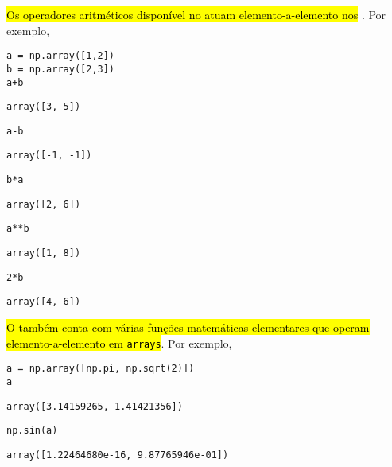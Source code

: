 \hl{Os operadores aritméticos disponível no {\python} atuam elemento-a-elemento nos {\PYTHONnumpyDOTarrays}}. Por exemplo,

\begin{lstlisting}
a = np.array([1,2])
b = np.array([2,3])
a+b
\end{lstlisting}

\begin{verbatim}
array([3, 5])
\end{verbatim}

\begin{lstlisting}
a-b
\end{lstlisting}

\begin{verbatim}
array([-1, -1])
\end{verbatim}

\begin{lstlisting}
b*a
\end{lstlisting}

\begin{verbatim}
array([2, 6])
\end{verbatim}

\begin{lstlisting}
a**b
\end{lstlisting}

\begin{verbatim}
array([1, 8])
\end{verbatim}

\begin{lstlisting}
2*b
\end{lstlisting}

\begin{verbatim}
array([4, 6])
\end{verbatim}


\hl{O {\numpy} também conta com várias funções matemáticas elementares que operam elemento-a-elemento em \texttt{arrays}}. Por exemplo,

\begin{lstlisting}
a = np.array([np.pi, np.sqrt(2)])
a
\end{lstlisting}

\begin{verbatim}
array([3.14159265, 1.41421356])
\end{verbatim}

\begin{lstlisting}
np.sin(a)
\end{lstlisting}

\begin{verbatim}
array([1.22464680e-16, 9.87765946e-01])
\end{verbatim}

